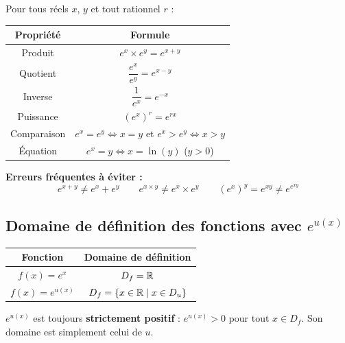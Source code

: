 \begin{propriete}
  Pour tous r\'{e}els $x$, $y$ et tout rationnel $r$ :

  \bigskip
  \begin{center}
  \renewcommand{\arraystretch}{2}
  \begin{tabular}{|c|c|}
    \hline
    \textbf{\color{navy}Propri\'{e}t\'{e}}
      & \textbf{\color{navy}Formule} \\
    \hline\hline
    Produit
      & $e^x \times e^y = e^{x+y}$ \\
    \hline
    Quotient
      & $\dfrac{e^x}{e^y} = e^{x-y}$ \\
    \hline
    Inverse
      & $\dfrac{1}{e^x} = e^{-x}$ \\
    \hline
    Puissance
      & $\left(e^x\right)^r = e^{rx}$ \\
    \hline
    Comparaison
      & $e^x = e^y \iff x = y$ \quad et \quad $e^x > e^y \iff x > y$ \\
    \hline
    \'{E}quation
      & $e^x = y \iff x = \ln(y)$ \quad ($y > 0$) \\
    \hline
  \end{tabular}
  \end{center}
\end{propriete}

\begin{attention}
  \textbf{Erreurs fr\'{e}quentes \`{a} \'{e}viter :}
  \[
    e^{x+y} \neq e^x + e^y \qquad
    e^{x \times y} \neq e^x \times e^y \qquad
    (e^x)^y = e^{xy} \neq e^{e^{xy}}
  \]
\end{attention}

\subsection{Domaine de d\'{e}finition des fonctions avec \texorpdfstring{$e^{u(x)}$}{e\^{u(x)}}}

\begin{propriete}
  \begin{center}
  \renewcommand{\arraystretch}{1.8}
  \begin{tabular}{|c|c|}
    \hline
    \textbf{\color{navy}Fonction}
      & \textbf{\color{navy}Domaine de d\'{e}finition} \\
    \hline\hline
    $f(x) = e^x$
      & $D_f = \mathbb{R}$ \\
    \hline
    $f(x) = e^{u(x)}$
      & $D_f = \{x \in \mathbb{R} \mid x \in D_u\}$ \\
    \hline
  \end{tabular}
  \end{center}

  \begin{remarque}
    $e^{u(x)}$ est toujours \textbf{strictement positif} :
    $e^{u(x)} > 0$ pour tout $x \in D_f$.
    Son domaine est simplement celui de $u$.
  \end{remarque}
\end{propriete}


